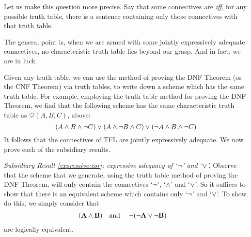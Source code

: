 Let us make this question more precise. Say that some connectives are  \emph{iff}, for any possible truth table, there is a sentence containing only those connectives with that truth table.


The general point is, when we are armed with some jointly expressively adequate connectives, no characteristic truth table lies beyond our grasp. And in fact, we are in luck.

Given any truth table, we can use the method of proving the DNF Theorem (or the CNF Theorem) via truth tables, to write down a scheme which has the same truth table. For example, employing the truth table method for proving the DNF Theorem, we find that the following scheme has the same characteristic truth table as $\heartsuit(A,B,C)$, above:
		$$(A \wedge B \wedge \neg C) \vee (A \wedge \neg B \wedge C) \vee (\neg A \wedge B \wedge \neg C)$$			
It follows that the connectives of TFL are jointly expressively adequate. We now prove each of the subsidiary results.
	
\emph{Subsidiary Result \ref{expressive:eor}: expressive adequacy of `$\neg$' and `$\vee$'.} Observe that the scheme that we generate, using the truth table method of proving the DNF Theorem, will only contain the connectives `$\neg$', `$\wedge$' and `$\vee$'. So it suffices to show that there is an equivalent scheme which contains only `$\neg$' and `$\vee$'. To show do this, we simply consider that
		\begin{align*}
		(\mathbf{A} \wedge \mathbf{B}) & \text{\quad and \quad} \neg(\neg \mathbf{A} \vee\neg \mathbf{B})
		\end{align*}
		are logically equivalent.

